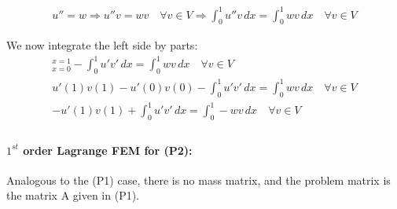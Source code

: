 \documentclass{article}
\begin{document}
\begin{gather*}
    u''=w \Rightarrow u''v=w v \quad \forall v\in V \Rightarrow \int_0^1 u''v \,dx=\int_0^1 w v \,dx\quad \forall v\in V
\end{gather*}

\noindent We now integrate the left side by parts:
\begin{gather*}
    [u'v]_{x=0}^{x=1}-\int_0^1 u'v'\, dx= \int_0^1 w v \,dx\quad \forall v\in V\\
    u'(1)v(1)-u'(0)v(0)-\int_0^1 u'v'\, dx= \int_0^1 w v \,dx\quad \forall v\in V\\
    -u'(1)v(1)+\int_0^1 u'v'\, dx= \int_0^1 -w v \,dx\quad \forall v\in V\\
\end{gather*}

\paragraph{$1^{st}$ order Lagrange FEM for (P2):}
\noindent Analogous to the (P1) case, there is no mass matrix, and the problem matrix is the matrix A given in (P1).

\end{document}
